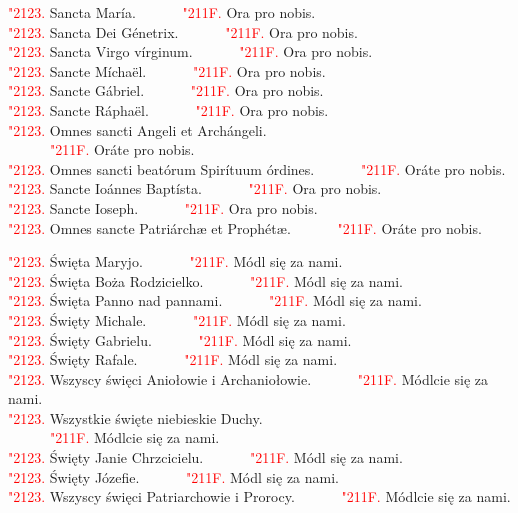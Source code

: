 \documentclass[10pt,a5paper]{book}
\newcommand{\kol}{red}
\newcommand{\textjuni}[1]{{\fontspec{Junicode-Regular}#1}}
\newcommand{\vv}{\textcolor{\kol}{\textjuni{\char"2123. }}}
\newcommand{\rrr}{\newline\textcolor{\kol}{\textjuni{~~~~~~\char"211F. }}}
\newcommand{\oremuss}[2]{
	\begin{sloppypar}
		\begin{paracol}{2}
			\setlength{\columnsep}{0em}
			\begin{leftcolumn}
				#1
			\end{leftcolumn}
			\begin{rightcolumn}
				#2
			\end{rightcolumn}
		\end{paracol}
	\end{sloppypar}}
\begin{document}
\oremuss{\vv Sancta María. \rrr Ora pro nobis.\\
	\vv Sancta Dei Génetrix. \rrr Ora pro nobis.\\
	\vv Sancta Virgo vírginum. \rrr Ora pro nobis.\\
	\vv Sancte Míchaël. \rrr Ora pro nobis.\\
	\vv Sancte Gábriel. \rrr Ora pro nobis.\\
	\vv Sancte Ráphaël. \rrr Ora pro nobis.\\
	\vv Omnes sancti Angeli et Archángeli.\\ \rrr Oráte pro nobis.\\
	\vv Omnes sancti beatórum Spirítuum órdines. \rrr Oráte pro nobis.\\
	\vv Sancte Ioánnes Baptísta. \rrr Ora pro nobis.\\
	\vv Sancte Ioseph. \rrr Ora pro nobis.\\
	\vv Omnes sancte Patriárchæ et Prophétæ. \rrr Oráte pro nobis.}{
	\vv Święta Maryjo. \rrr Módl się za nami.\\
	\vv Święta Boża Rodzicielko. \rrr Módl się za nami.\\
	\vv Święta Panno nad pannami. \rrr Módl się za nami.\\
	\vv Święty Michale. \rrr Módl się za nami.\\
	\vv Święty Gabrielu. \rrr Módl się za nami.\\
	\vv Święty Rafale. \rrr Módl się za nami.\\
	\vv Wszyscy święci Aniołowie i Archaniołowie. \rrr Módlcie się za nami.\\
	\vv Wszystkie święte niebieskie Duchy. \\ \rrr Módlcie się za nami.\\
	\vv Święty Janie Chrzcicielu. \rrr Módl się za nami.\\
	\vv Święty Józefie. \rrr Módl się za nami.\\
	\vv Wszyscy święci Patriarchowie i Prorocy. \rrr Módlcie się za nami.}
\vspace*{-0.2cm}
\end{document}
